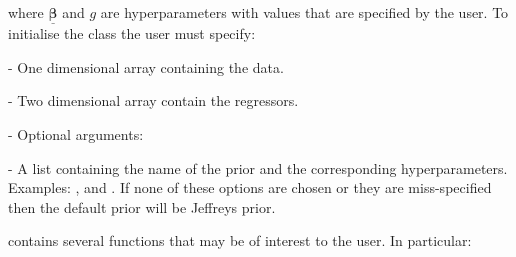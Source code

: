 \documentclass[article]{jss}
\begin{document}
where $\bm{\underline{\beta}}$ and $g$ are hyperparameters with values
that are specified by the user. To initialise the class
 the user must specify:
\begin{description}
\item {} - One dimensional  array containing the
  data.
\item {} - Two dimensional  array contain the
  regressors.
\item {} - Optional arguments:

  \begin{description}
  \item {} - A list containing the name of the prior and the
    corresponding hyperparameters. Examples: \newline
     ,\newline
     and \newline
    . \newline
    If none of these options are chosen or they are
    miss-specified then the default prior will be Jeffreys prior.
  \end{description}
\end{description}
 contains several functions that may be of
interest to the user. In particular:
\end{document}
